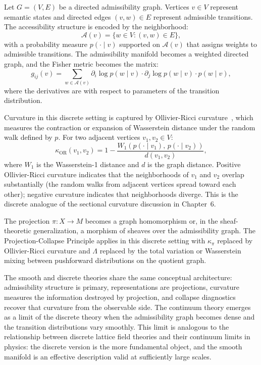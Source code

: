 \documentclass[12pt, oneside]{book}
\theoremstyle{plain-flyxion}
\theoremstyle{definition-flyxion}
\newcommand{\A}{\mathcal{A}}
\newcommand{\kpi}{\kappa_{\pi}}
\newcommand{\Lam}{\Lambda}
\begin{document}
Let $G = (V, E)$ be a directed admissibility graph. Vertices $v \in V$ represent
semantic states and directed edges $(v, w) \in E$ represent admissible transitions.
The accessibility structure is encoded by the neighborhood:
\[
\A(v) = \{w \in V : (v, w) \in E\},
\]
with a probability measure $p(\cdot \mid v)$ supported on $\A(v)$ that assigns weights
to admissible transitions. The admissibility manifold becomes a weighted directed graph,
and the Fisher metric becomes the matrix:
\[
g_{ij}(v) = \sum_{w \in \A(v)} \partial_i \log p(w \mid v) \cdot \partial_j \log p(w
\mid v) \cdot p(w \mid v),
\]
where the derivatives are with respect to parameters of the transition distribution.

Curvature in this discrete setting is captured by Ollivier-Ricci curvature~\cite{ollivier2009},
which measures the contraction or expansion of Wasserstein distance under the random
walk defined by $p$. For two adjacent vertices $v_1, v_2 \in V$:
\begin{equation}\label{eq:ollivier}
\kappa_{\mathrm{OR}}(v_1, v_2) = 1 - \frac{W_1(p(\cdot\mid v_1),\, p(\cdot\mid v_2))}{d(v_1, v_2)},
\end{equation}
where $W_1$ is the Wasserstein-1 distance and $d$ is the graph distance. Positive
Ollivier-Ricci curvature indicates that the neighborhoods of $v_1$ and $v_2$ overlap
substantially (the random walks from adjacent vertices spread toward each other);
negative curvature indicates that neighborhoods diverge. This is the discrete analogue
of the sectional curvature discussion in Chapter~6.

The projection $\pi: X \to M$ becomes a graph homomorphism or, in the sheaf-theoretic
generalization, a morphism of sheaves over the admissibility graph. The Projection-Collapse
Principle applies in this discrete setting with $\kpi$ replaced by Ollivier-Ricci
curvature and $\Lam$ replaced by the total variation or Wasserstein mixing between
pushforward distributions on the quotient graph.

The smooth and discrete theories share the same conceptual architecture: admissibility
structure is primary, representations are projections, curvature measures the information
destroyed by projection, and collapse diagnostics recover that curvature from the
observable side. The continuum theory emerges as a limit of the discrete theory when
the admissibility graph becomes dense and the transition distributions vary smoothly.
This limit is analogous to the relationship between discrete lattice field theories and
their continuum limits in physics: the discrete version is the more fundamental object,
and the smooth manifold is an effective description valid at sufficiently large scales.
\end{document}
